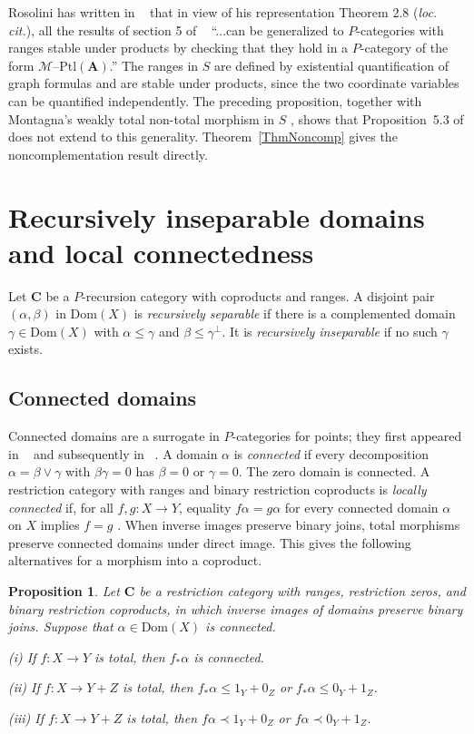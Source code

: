 \documentclass[letterpaper,10pt]{amsart}
\theoremstyle{plain}
\newtheorem{prop}{Proposition}[thm]
\theoremstyle{definition}
\newcommand{\MAP}[3]{{#1}:{#2}\rightarrow{#3}}
\begin{document}
Rosolini has written in  ~\cite[page 313]{MR90e:18001} that in view of his representation Theorem 2.8 ({\it loc. cit.}), all the results of section 5 of ~\cite{MR88i:03078} ``...can be generalized to $P$-categories with ranges stable under products by checking that they hold in a $P$-category of the form
$\mathcal{M}$--$\mathrm{Ptl}(\mathbf{A})$.'' The ranges in $S$ are defined
by existential quantification of graph formulas \cite[p.~111]{MR90i:03046}
and are stable under products, since the two coordinate variables can
be quantified independently. The preceding proposition,
together with Montagna's weakly total non-total morphism in $S$
\cite[Example~1, p.~112]{MR90i:03046}, shows that Proposition~5.3 of
\cite{MR88i:03078} does not extend to this generality. Theorem~\ref{ThmNoncomp} gives the noncomplementation result directly.

\section{Recursively inseparable domains and local connectedness}\label{sec:inseparability}

Let $\mathbf C$ be a $P$-recursion category with coproducts and ranges.
A disjoint pair $(\alpha,\beta)$ in $\mathrm{Dom}(X)$ is
\textit{recursively separable} if there is a complemented domain
$\gamma\in\mathrm{Dom}(X)$ with $\alpha\le\gamma$ and
$\beta\le\gamma^\perp$. It is \textit{recursively inseparable}
if no such $\gamma$ exists.

\subsection{Connected domains}
Connected domains are a surrogate in $P$-categories for points; they  first appeared in ~\cite{MR92e:03067} and subsequently in ~\cite{MR93b:03103,leng}.
A domain $\alpha$ is \textit{connected} if every decomposition
$\alpha=\beta\vee\gamma$ with $\beta\gamma=0$ has $\beta=0$ or
$\gamma=0$. The zero domain is connected. A restriction category with
ranges and binary restriction coproducts is \textit{locally connected}
if, for all $f,g:X\to Y$, equality $f\alpha=g\alpha$ for every
connected domain $\alpha$ on $X$ implies $f=g$ \cite{MR92e:03067}.
When inverse images preserve binary joins, total morphisms preserve
connected domains under direct image. This gives the following
alternatives for a morphism into a coproduct.

\begin{prop}\label{PropAlternative}
Let $\mathbf C$ be a restriction category with ranges, restriction zeros,
and binary restriction coproducts, in which inverse images of domains
preserve binary joins. Suppose that $\alpha\in\mathrm{Dom}(X)$ is
connected.

\noindent(i) If $\MAP{f}{X}{Y}$ is total, then $f_*\alpha$ is connected.

\noindent(ii) If $\MAP{f}{X}{Y + Z}$ is total,
then $f_*\alpha\le 1_Y+0_Z$ or $f_*\alpha\le 0_Y+ 1_Z$.

\noindent(iii) If $\MAP{f}{X}{Y+ Z}$ is total,
then $f\alpha\prec 1_Y+0_Z$ or $f\alpha\prec 0_Y+1_Z$.
\end{prop}
\end{document}

